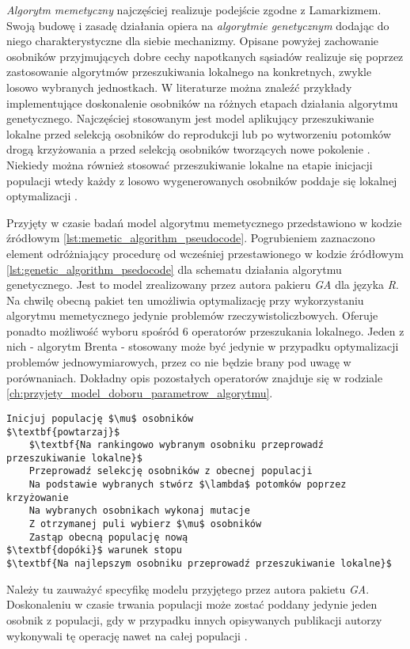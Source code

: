 \emph{Algorytm memetyczny} najczęściej realizuje podejście zgodne z Lamarkizmem. Swoją budowę i zasadę działania opiera na \emph{algorytmie genetycznym} dodając do niego charakterystyczne dla siebie mechanizmy. Opisane powyżej zachowanie osobników przyjmujących dobre cechy napotkanych sąsiadów realizuje się poprzez zastosowanie algorytmów przeszukiwania lokalnego na konkretnych, zwykle losowo wybranych jednostkach. W literaturze można znaleźć przykłady implementujące doskonalenie osobników na różnych etapach działania algorytmu genetycznego. Najczęściej stosowanym jest model aplikujący przeszukiwanie lokalne przed selekcją osobników do reprodukcji \cite{maringer2006portfolio} lub po wytworzeniu potomków drogą krzyżowania a przed selekcją osobników tworzących nowe pokolenie \cite{sudholt2008computational}. Niekiedy można również stosować przeszukiwanie lokalne na etapie inicjacji populacji	wtedy każdy z losowo wygenerowanych osobników poddaje się lokalnej optymalizacji \cite{elbeltagi2005comparison}.
\par
Przyjęty w czasie badań model algorytmu memetycznego przedstawiono w kodzie źródłowym \ref{lst:memetic_algorithm_pseudocode}. Pogrubieniem zaznaczono element odróżniający procedurę od wcześniej przestawionego w kodzie źródłowym \ref{lst:genetic_algorithm_psedocode} dla schematu działania algorytmu genetycznego. Jest to model zrealizowany przez autora pakieru \emph{GA} dla języka \emph{R}. Na chwilę obecną pakiet ten umożliwia optymalizację przy wykorzystaniu algorytmu memetycznego jedynie problemów rzeczywistoliczbowych. Oferuje ponadto możliwość wyboru spośród 6 operatorów przeszukania lokalnego. Jeden z nich - algorytm Brenta - stosowany może być jedynie w przypadku optymalizacji problemów jednowymiarowych, przez co nie będzie brany pod uwagę w porównaniach. Dokładny opis pozostałych operatorów znajduje się w rodziale \ref{ch:przyjety_model_doboru_parametrow_algorytmu}.  
\begin{lstlisting}[caption=Model algorytmu memetycznego stosowany w pakiecie \emph{GA}, label=lst:memetic_algorithm_pseudocode, mathescape]
Inicjuj populację $\mu$ osobników
$\textbf{powtarzaj}$
    $\textbf{Na rankingowo wybranym osobniku przeprowadź przeszukiwanie lokalne}$
    Przeprowadź selekcję osobników z obecnej populacji
    Na podstawie wybranych stwórz $\lambda$ potomków poprzez krzyżowanie
    Na wybranych osobnikach wykonaj mutacje
    Z otrzymanej puli wybierz $\mu$ osobników
    Zastąp obecną populację nową
$\textbf{dopóki}$ warunek stopu
$\textbf{Na najlepszym osobniku przeprowadź przeszukiwanie lokalne}$
\end{lstlisting}
\par
Należy tu zauważyć specyfikę modelu przyjętego przez autora pakietu \emph{GA}. Doskonaleniu w czasie trwania populacji może zostać poddany jedynie jeden osobnik z populacji, gdy w przypadku innych opisywanych publikacji autorzy wykonywali tę operację nawet na całej populacji \cite{elbeltagi2005comparison}\cite{sudholt2008computational}\cite{ong2006classification}.

